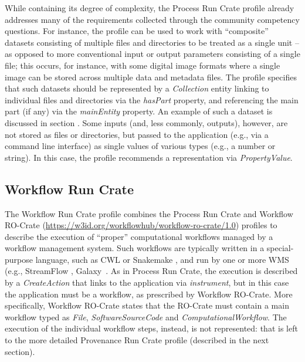 \documentclass[10pt,letterpaper]{article}
\begin{document}
While containing its degree of complexity, the Process Run Crate profile already addresses many of the requirements collected through the community competency questions. 
For instance, the profile can be used to work with “composite” datasets consisting of multiple files and directories to be treated as a single unit – as opposed to more conventional input or output parameters consisting of a single file;
this occurs, for instance, with some digital image formats where a single image can be stored across multiple data and metadata files.
The profile specifies that such datasets should be represented by a
\emph{Collection} entity linking to individual files and directories via the \emph{hasPart} property, and referencing the main part (if any) via the \emph{mainEntity} property.
An example of such a dataset is discussed in section .
Some inputs (and, less commonly, outputs), however, are not stored as files or directories, but passed to the application (e.g., via a command line interface) as single values of various types (e.g., a number or string).
In this case, the profile recommends a representation via \emph{PropertyValue}.

\subsection{Workflow Run Crate}\label{workflow-run-crate}

The Workflow Run Crate profile combines the Process Run Crate and Workflow RO-Crate (\url{https://w3id.org/workflowhub/workflow-ro-crate/1.0}) profiles to describe the execution of “proper” computational workflows managed by a workflow management system.
Such workflows are typically written in a special-purpose language, such as CWL or Snakemake
\cite{Koster 2012}, and run by one or more WMS (e.g., StreamFlow
\cite{Streamflow}, Galaxy~\cite{Galaxy 2022}.
As in Process Run Crate, the execution is described by a \emph{CreateAction}
that links to the application via \emph{instrument}, but in this case the application must be a workflow, as prescribed by Workflow RO-Crate.
More specifically, Workflow RO-Crate states that the RO-Crate must contain a main workflow typed as \emph{File}, \emph{SoftwareSourceCode}
and \emph{ComputationalWorkflow}.
The execution of the individual workflow steps, instead, is not represented: that is left to the more detailed Provenance Run Crate profile (described in the next section).
\end{document}
